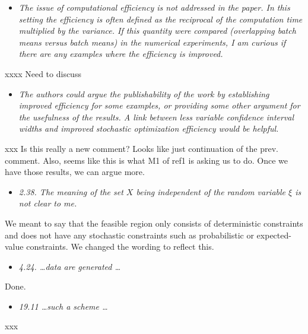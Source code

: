 \documentclass[11pt,notitlepage,onecolumn]{article}
\newcommand{\noi}{\noindent}
\begin{document}
\begin{itemize}
\item[] \textit{The issue of computational efficiency is not addressed  in the paper. 
In this setting the efficiency is often defined as the reciprocal of the computation time multiplied by the variance. 
If this quantity were compared (overlapping batch means versus batch means) in the numerical experiments, I am curious if there are any examples where the efficiency is improved.}
\end{itemize}

\noi 
xxxx Need to discuss
\medskip 


\begin{itemize}
\item[] \textit{The authors could argue the publishability of the work by establishing improved efficiency for some examples, or providing some other argument for the usefulness of the results.  
A link between less variable confidence interval widths and improved stochastic optimization efficiency would be helpful.}
\end{itemize}

\noi
xxx  Is this really a new comment?  Looks like just continuation of the prev. comment. 
Also, seems like this is what M1 of ref1 is asking us to do. 
Once we have those results, we can argue more.
\medskip  

\bigskip 


\noi {\bf \large Minor comments:}
\medskip 



\begin{itemize}
\item[] \textit{2.38. The meaning of the set $X$ being independent of the random variable $\xi$ is not clear to me.}
\end{itemize}

\noi 
We meant to say that the feasible region only consists of deterministic constraints and does not have any stochastic constraints such as probabilistic or expected-value constraints. 
We changed the wording to reflect this. 
\medskip 


\begin{itemize}
\item[] \textit{4.24. \ldots data are generated \ldots}
\end{itemize}

\noi 
Done.
\medskip

\begin{itemize}
\item[] \textit{19.11 \ldots such a scheme \ldots}
\end{itemize}

\noi
xxx 
\end{document}
